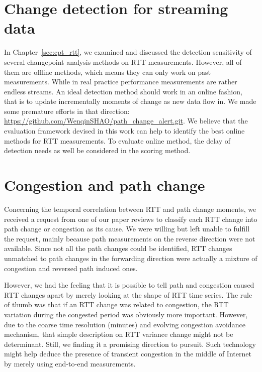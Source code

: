 \section{Change detection for streaming data}
In Chapter~\ref{sec:cpt_rtt}, we examined and discussed the detection sensitivity of several changepoint analysis methods on RTT measurements. However, all of them are offline methods, which means they can only work on past measurements. While in real practice performance measurements are rather endless streams. An ideal detection method should work in an online fashion, that is to update incrementally moments of change as new data flow in. We made some premature efforts in that direction: \url{https://github.com/WenqinSHAO/path_change_alert.git}. We believe that the evaluation framework devised in this work can help to identify the best online methods for RTT measurements.
To evaluate online method, the delay of detection needs as well be considered in the scoring method.

\section{Congestion and path change}
Concerning the temporal correlation between RTT and path change moments, we received a request from one of our paper reviews to classify each RTT change into path change or congestion as its cause. We were willing but left unable to fulfill the request,  mainly because path measurements on the reverse direction were not available. Since not all the path changes could be identified, RTT changes unmatched to path changes in the forwarding direction were actually a mixture of congestion and reversed path induced ones.

However, we had the feeling that it is possible to tell path and congestion caused RTT changes apart by merely looking at the shape of RTT time series. The rule of thumb was that if an RTT change was related to congestion, the RTT variation during the congested period was obviously more important. However, due to the coarse time resolution (minutes) and evolving congestion avoidance mechanism, that simple description on RTT variance change might not be determinant. Still, we finding it a promising direction to pursuit. Such technology might help deduce the presence of transient congestion in the middle of Internet by merely using end-to-end measurements.

